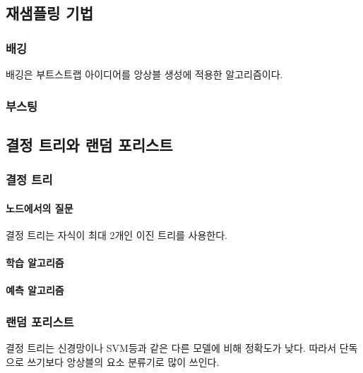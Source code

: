 \documentclass [12pt] {oblivoir}
\let\oldsubsubsection=\subsubsection
\renewcommand{\subsubsection}
{
  \filbreak
  \oldsubsubsection
}
\begin{document}
\subsection{재샘플링 기법}

\subsubsection{배깅}

배깅은 부트스트랩 아이디어를 앙상블 생성에 적용한 알고리즘이다.

\subsubsection{부스팅}

\subsection{결정 트리와 랜덤 포리스트}

\subsubsection{결정 트리}

\paragraph*{노드에서의 질문}\mbox{}

결정 트리는 자식이 최대 2개인 이진 트리를 사용한다.

\vspace{3mm}

\paragraph*{학습 알고리즘}\mbox{}

\vspace{3mm}

\paragraph*{예측 알고리즘}\mbox{}

\vspace{3mm}

\subsubsection{랜덤 포리스트}

결정 트리는 신경망이나 SVM등과 같은 다른 모델에 비해 정확도가 낮다.
따라서 단독으로 쓰기보다 앙상블의 요소 분류기로 많이 쓰인다.
\end{document}
